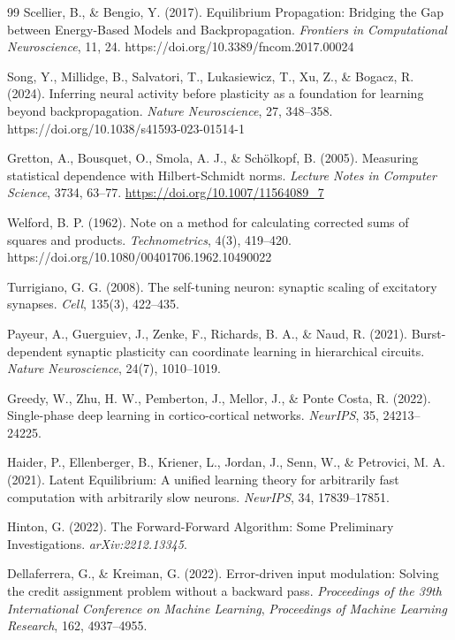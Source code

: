 \begin{thebibliography}{99}
    Scellier, B., \& Bengio, Y. (2017).
    Equilibrium Propagation: Bridging the Gap between Energy-Based Models and Backpropagation.
    \emph{Frontiers in Computational Neuroscience}, 11, 24. https://doi.org/10.3389/fncom.2017.00024
    
    Song, Y., Millidge, B., Salvatori, T., Lukasiewicz, T., Xu, Z., \& Bogacz, R. (2024).
    Inferring neural activity before plasticity as a foundation for learning beyond backpropagation.
    \emph{Nature Neuroscience}, 27, 348--358. https://doi.org/10.1038/s41593-023-01514-1
    
    Gretton, A., Bousquet, O., Smola, A. J., \& Sch{\"o}lkopf, B. (2005).
    Measuring statistical dependence with Hilbert-Schmidt norms.
    \emph{Lecture Notes in Computer Science}, 3734, 63--77. \url{https://doi.org/10.1007/11564089_7}
    
    Welford, B. P. (1962).
    Note on a method for calculating corrected sums of squares and products.
    \emph{Technometrics}, 4(3), 419--420. https://doi.org/10.1080/00401706.1962.10490022
    
    Turrigiano, G. G. (2008).
    The self-tuning neuron: synaptic scaling of excitatory synapses.
    \emph{Cell}, 135(3), 422--435.
    
    Payeur, A., Guerguiev, J., Zenke, F., Richards, B. A., \& Naud, R. (2021).
    Burst-dependent synaptic plasticity can coordinate learning in hierarchical circuits.
    \emph{Nature Neuroscience}, 24(7), 1010--1019.
    
    Greedy, W., Zhu, H. W., Pemberton, J., Mellor, J., \& Ponte Costa, R. (2022).
    Single-phase deep learning in cortico-cortical networks.
    \emph{NeurIPS}, 35, 24213--24225.
    
    Haider, P., Ellenberger, B., Kriener, L., Jordan, J., Senn, W., \& Petrovici, M. A. (2021).
    Latent Equilibrium: A unified learning theory for arbitrarily fast computation with arbitrarily slow neurons.
    \emph{NeurIPS}, 34, 17839--17851.
    
    Hinton, G. (2022).
    The Forward-Forward Algorithm: Some Preliminary Investigations.
    \emph{arXiv:2212.13345}.
    
    Dellaferrera, G., \& Kreiman, G. (2022).
    Error-driven input modulation: Solving the credit assignment problem without a backward pass.
    \emph{Proceedings of the 39th International Conference on Machine Learning}, \emph{Proceedings of Machine Learning Research}, 162, 4937--4955.
    

\end{thebibliography}
